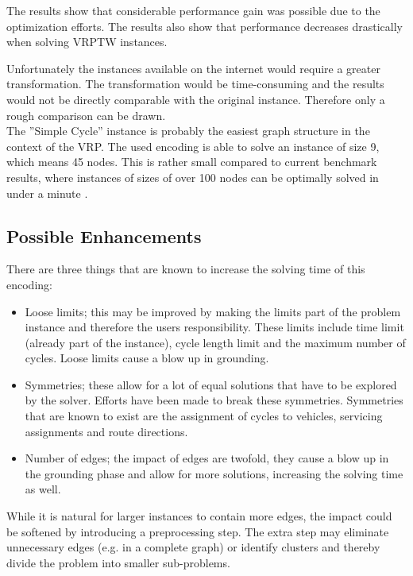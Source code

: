 \documentclass[12pt, letterpaper]{article}
\begin{document}
The results show that considerable performance gain was possible due to the optimization efforts. The results also show that performance decreases drastically when solving VRPTW instances.


Unfortunately the instances available on the internet would require a greater transformation. The transformation would be time-consuming and the results would not be directly comparable with the original instance. Therefore only a rough comparison can be drawn.\\
The ''Simple Cycle'' instance is probably the easiest graph structure in the context of the VRP. The used encoding is able to solve an instance of size 9, which means 45 nodes. This is rather small compared to current benchmark results, where instances of sizes of over 100 nodes can be optimally solved in under a minute \cite{benchmark}.

\subsection{Possible Enhancements}
There are three things that are known to increase the solving time of this encoding:
\begin{itemize}
	\item Loose limits; this may be improved by making the limits part of the problem instance and therefore the users responsibility. These limits include time limit (already part of the instance), cycle length limit and the maximum number of cycles. Loose limits cause a blow up in grounding.
	\item Symmetries; these allow for a lot of equal solutions that have to be explored by the solver. Efforts have been made to break these symmetries. Symmetries that are known to exist are the assignment of cycles to vehicles, servicing assignments and route directions.
	\item Number of edges; the impact of edges are twofold, they cause a blow up in the grounding phase and allow for more solutions, increasing the solving time as well.
\end{itemize}

While it is natural for larger instances to contain more edges, the impact could be softened by introducing a preprocessing step. The extra step may eliminate unnecessary edges (e.g. in a complete graph) or identify clusters and thereby divide the problem into smaller sub-problems.
\end{document}
